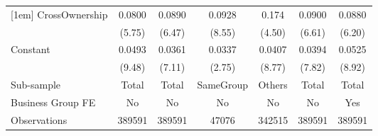 {\begin{tabular}{l*{6}{c}}
[1em]
CrossOwnership  &   0.0800\sym{***}&   0.0890\sym{***}&   0.0928\sym{***}&    0.174\sym{***}&   0.0900\sym{***}&   0.0880\sym{***}\\
                &   (5.75)         &   (6.47)         &   (8.55)         &   (4.50)         &   (6.61)         &   (6.20)         \\
[1em]
Constant        &   0.0493\sym{***}&   0.0361\sym{***}&   0.0337\sym{**} &   0.0407\sym{***}&   0.0394\sym{***}&   0.0525\sym{***}\\
                &   (9.48)         &   (7.11)         &   (2.75)         &   (8.77)         &   (7.82)         &   (8.92)         \\
\hline
Sub-sample      &    Total         &    Total         &SameGroup         &   Others         &    Total         &    Total         \\
Business Group FE&       No         &       No         &       No         &       No         &       No         &      Yes         \\
Observations    &   389591         &   389591         &    47076         &   342515         &   389591         &   389591         \\
\hline\hline  \end{tabular}}
